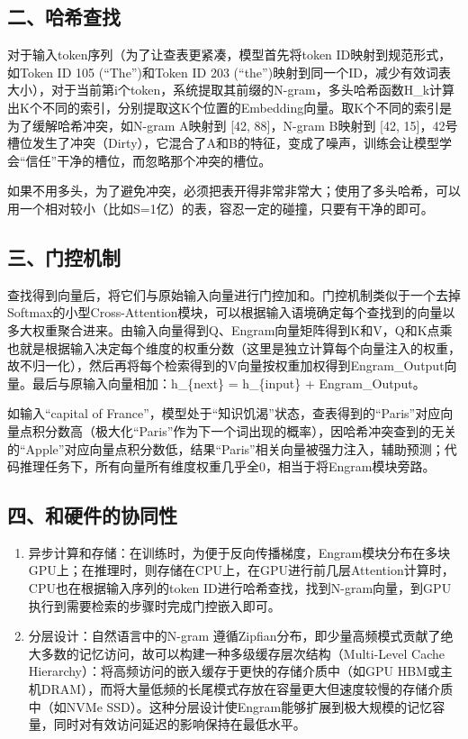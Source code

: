 \hypertarget{ux4e8cux54c8ux5e0cux67e5ux627e}{%
\subsection{二、哈希查找}\label{ux4e8cux54c8ux5e0cux67e5ux627e}}

对于输入token序列（为了让查表更紧凑，模型首先将token ID映射到规范形式，如Token ID 105 (``The'')和Token ID 203 (``the'')映射到同一个ID，减少有效词表大小），对于当前第i个token，系统提取其前缀的N-gram，多头哈希函数H\_k计算出K个不同的索引，分别提取这K个位置的Embedding向量。取K个不同的索引是为了缓解哈希冲突，如N-gram A映射到 {[}42, 88{]}，N-gram B映射到 {[}42, 15{]}，42号槽位发生了冲突（Dirty），它混合了A和B的特征，变成了噪声，训练会让模型学会``信任''干净的槽位，而忽略那个冲突的槽位。

如果不用多头，为了避免冲突，必须把表开得非常非常大；使用了多头哈希，可以用一个相对较小（比如S=1亿）的表，容忍一定的碰撞，只要有干净的即可。

\hypertarget{ux4e09ux95e8ux63a7ux673aux5236}{%
\subsection{三、门控机制}\label{ux4e09ux95e8ux63a7ux673aux5236}}

查找得到向量后，将它们与原始输入向量进行门控加和。门控机制类似于一个去掉Softmax的小型Cross-Attention模块，可以根据输入语境确定每个查找到的向量以多大权重聚合进来。由输入向量得到Q、Engram向量矩阵得到K和V，Q和K点乘也就是根据输入决定每个维度的权重分数（这里是独立计算每个向量注入的权重，故不归一化），然后再将每个检索得到的V向量按权重加权得到Engram\_Output向量。最后与原输入向量相加：h\_\{next\} = h\_\{input\} + Engram\_Output。

如输入``capital of France''，模型处于``知识饥渴''状态，查表得到的``Paris''对应向量点积分数高（极大化``Paris''作为下一个词出现的概率），因哈希冲突查到的无关的``Apple''对应向量点积分数低，结果``Paris''相关向量被强力注入，辅助预测；代码推理任务下，所有向量所有维度权重几乎全0，相当于将Engram模块旁路。

\hypertarget{ux56dbux548cux786cux4ef6ux7684ux534fux540cux6027}{%
\subsection{四、和硬件的协同性}\label{ux56dbux548cux786cux4ef6ux7684ux534fux540cux6027}}

\begin{enumerate}
\def\labelenumi{\arabic{enumi}.}
\item
  异步计算和存储：在训练时，为便于反向传播梯度，Engram模块分布在多块GPU上；在推理时，则存储在CPU上，在GPU进行前几层Attention计算时，CPU也在根据输入序列的token ID进行哈希查找，找到N-gram向量，到GPU执行到需要检索的步骤时完成门控嵌入即可。
\item
  分层设计：自然语言中的N-gram 遵循Zipfian分布，即少量高频模式贡献了绝大多数的记忆访问，故可以构建一种多级缓存层次结构（Multi-Level Cache Hierarchy）：将高频访问的嵌入缓存于更快的存储介质中（如GPU HBM或主机DRAM），而将大量低频的长尾模式存放在容量更大但速度较慢的存储介质中（如NVMe SSD）。这种分层设计使Engram能够扩展到极大规模的记忆容量，同时对有效访问延迟的影响保持在最低水平。
\end{enumerate}

